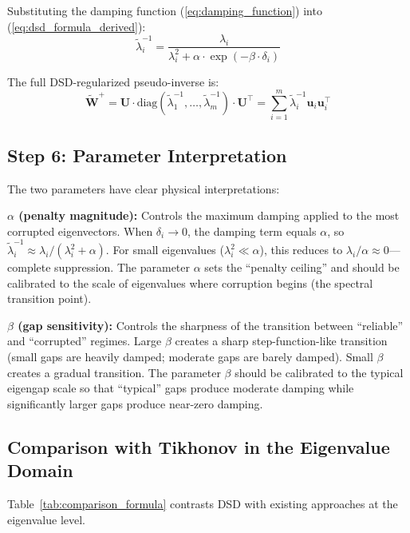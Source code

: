 \documentclass[journal]{IEEEtran}
\begin{document}
Substituting the damping function (\ref{eq:damping_function}) into (\ref{eq:dsd_formula_derived}):
\begin{equation}
\boxed{\tilde{\lambda}_i^{-1} = \frac{\lambda_i}{\lambda_i^2 + \alpha \cdot \exp(-\beta \cdot \delta_i)}}
\label{eq:dsd_final}
\end{equation}

The full DSD-regularized pseudo-inverse is:
\begin{equation}
\tilde{\bm{W}}^+ = \bm{U} \cdot \text{diag}(\tilde{\lambda}_1^{-1}, \ldots, \tilde{\lambda}_m^{-1}) \cdot \bm{U}^\top = \sum_{i=1}^m \tilde{\lambda}_i^{-1} \bm{u}_i \bm{u}_i^\top
\label{eq:dsd_pseudoinverse}
\end{equation}

\subsection{Step 6: Parameter Interpretation}
\label{sec:param_interpretation}

The two parameters have clear physical interpretations:

\textbf{$\alpha$ (penalty magnitude):} Controls the maximum damping applied to the most corrupted eigenvectors. When $\delta_i \to 0$, the damping term equals $\alpha$, so $\tilde{\lambda}_i^{-1} \approx \lambda_i / (\lambda_i^2 + \alpha)$. For small eigenvalues ($\lambda_i^2 \ll \alpha$), this reduces to $\lambda_i / \alpha \approx 0$---complete suppression. The parameter $\alpha$ sets the ``penalty ceiling'' and should be calibrated to the scale of eigenvalues where corruption begins (the spectral transition point).

\textbf{$\beta$ (gap sensitivity):} Controls the sharpness of the transition between ``reliable'' and ``corrupted'' regimes. Large $\beta$ creates a sharp step-function-like transition (small gaps are heavily damped; moderate gaps are barely damped). Small $\beta$ creates a gradual transition. The parameter $\beta$ should be calibrated to the typical eigengap scale so that ``typical'' gaps produce moderate damping while significantly larger gaps produce near-zero damping.

\subsection{Comparison with Tikhonov in the Eigenvalue Domain}

Table~\ref{tab:comparison_formula} contrasts DSD with existing approaches at the eigenvalue level.
\end{document}
